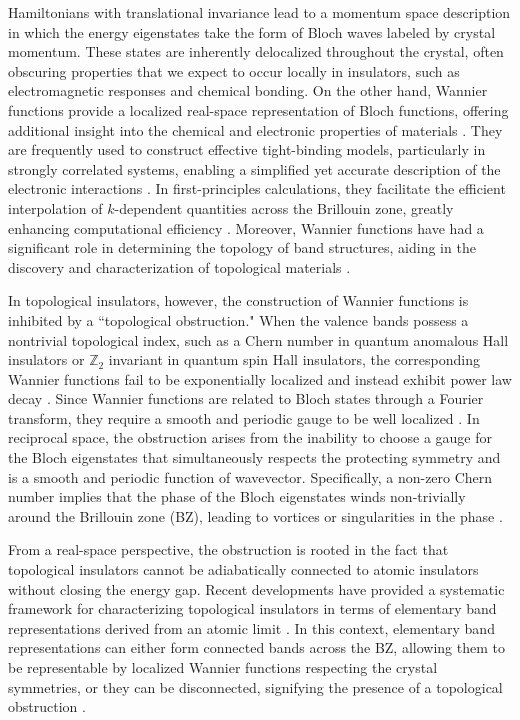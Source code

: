 \documentclass[galley,aps,pra,10pt,amsmath,amssymb,
    superscriptaddress,nofootinbib,longbibliography]{revtex4-2}
\begin{document}
Hamiltonians with translational invariance lead to a momentum space description in which the energy eigenstates take the form of Bloch waves labeled by crystal momentum. These states are inherently delocalized throughout the crystal, often obscuring properties that we expect to occur locally in insulators, such as electromagnetic responses and chemical bonding. On the other hand, Wannier functions provide a localized real-space representation of Bloch functions, offering additional insight into the chemical and electronic properties of materials \cite{wannier1937, kohn1959, foster1960, boys1960,cloizeaux1964, strinati1978}. They are frequently used to construct effective tight-binding models, particularly in strongly correlated systems, enabling a simplified yet accurate description of the electronic interactions \cite{solovyev2006, jung2013, gresch2018, lihm2019, Li_2021}. In first-principles calculations, they facilitate the efficient interpolation of $k$-dependent quantities across the Brillouin zone, greatly enhancing computational efficiency \cite{yates2007, calzolari2004}. Moreover, Wannier functions have had a significant role in determining the topology of band structures, aiding in the discovery and characterization of topological materials \cite{kruthoff2017, Bradlyn2017, po2019, Po2018}.

In topological insulators, however, the construction of Wannier functions is inhibited by a ``topological obstruction." When the valence bands possess a nontrivial topological index, such as a Chern number in quantum anomalous Hall insulators or $\mathbb{Z}_2$ invariant in quantum spin Hall insulators, the corresponding Wannier functions fail to be exponentially localized and instead exhibit power law decay \cite{Bradlyn2017, Po2018}. Since Wannier functions are related to Bloch states through a Fourier transform, they require a smooth and periodic gauge to be well localized \cite{strinati1978}. In reciprocal space, the obstruction arises from the inability to choose a gauge for the Bloch eigenstates that simultaneously respects the protecting symmetry and is a smooth and periodic function of wavevector. Specifically, a non-zero Chern number implies that the phase of the Bloch eigenstates winds non-trivially around the Brillouin zone (BZ), leading to vortices or singularities in the phase \cite{thronhauser2006,  soluyanov2011, Vanderbilt2018}. 

From a real-space perspective, the obstruction is rooted in the fact that topological insulators cannot be adiabatically connected to atomic insulators without closing the energy gap. Recent developments have provided a systematic framework for characterizing topological insulators in terms of elementary band representations derived from an atomic limit \cite{kruthoff2017, Bradlyn2017, Cano2018, Cano2021}. In this context, elementary band representations can either form connected bands across the BZ, allowing them to be representable by localized Wannier functions respecting the crystal symmetries, or they can be disconnected, signifying the presence of a topological obstruction \cite{Cano2018}.
\end{document}
